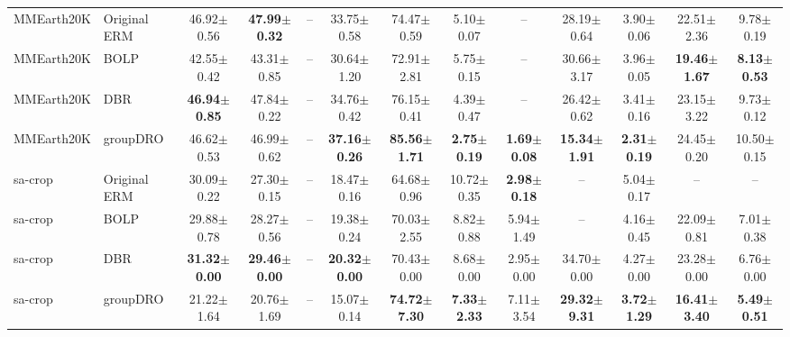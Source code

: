 \documentclass[11pt]{article}
\begin{document}
\begin{table}[h!]
{\begin{tabular}{llccccccccccc}
\midrule

MMEarth20K & Original ERM & 46.92$\pm$0.56 & \textbf{47.99$\pm$0.32} & -- & 33.75$\pm$0.58 & 74.47$\pm$0.59 & 5.10$\pm$0.07 & -- & 28.19$\pm$0.64 & 3.90$\pm$0.06 & 22.51$\pm$2.36 & 9.78$\pm$0.19 \\
MMEarth20K & BOLP & 42.55$\pm$0.42 & 43.31$\pm$0.85 & -- & 30.64$\pm$1.20 & 72.91$\pm$2.81 & 5.75$\pm$0.15 & -- & 30.66$\pm$3.17 & 3.96$\pm$0.05 & \textbf{19.46$\pm$1.67} & \textbf{8.13$\pm$0.53} \\
MMEarth20K & DBR & \textbf{46.94$\pm$0.85} & 47.84$\pm$0.22 & -- & 34.76$\pm$0.42 & 76.15$\pm$0.41 & 4.39$\pm$0.47 & -- & 26.42$\pm$0.62 & 3.41$\pm$0.16 & 23.15$\pm$3.22 & 9.73$\pm$0.12 \\
MMEarth20K & groupDRO & 46.62$\pm$0.53 & 46.99$\pm$0.62 & -- & \textbf{37.16$\pm$0.26} & \textbf{85.56$\pm$1.71} & \textbf{2.75$\pm$0.19} & \textbf{1.69$\pm$0.08} & \textbf{15.34$\pm$1.91} & \textbf{2.31$\pm$0.19} & 24.45$\pm$0.20 & 10.50$\pm$0.15 \\

\midrule

sa-crop & Original ERM & 30.09$\pm$0.22 & 27.30$\pm$0.15 & -- & 18.47$\pm$0.16 & 64.68$\pm$0.96 & 10.72$\pm$0.35 & \textbf{2.98$\pm$0.18} & -- & 5.04$\pm$0.17 & -- & -- \\
sa-crop & BOLP & 29.88$\pm$0.78 & 28.27$\pm$0.56 & -- & 19.38$\pm$0.24 & 70.03$\pm$2.55 & 8.82$\pm$0.88 & 5.94$\pm$1.49 & -- & 4.16$\pm$0.45 & 22.09$\pm$0.81 & 7.01$\pm$0.38 \\
sa-crop & DBR & \textbf{31.32$\pm$0.00} & \textbf{29.46$\pm$0.00} & -- & \textbf{20.32$\pm$0.00} & 70.43$\pm$0.00 & 8.68$\pm$0.00 & 2.95$\pm$0.00 & 34.70$\pm$0.00 & 4.27$\pm$0.00 & 23.28$\pm$0.00 & 6.76$\pm$0.00 \\
sa-crop & groupDRO & 21.22$\pm$1.64 & 20.76$\pm$1.69 & -- & 15.07$\pm$0.14 & \textbf{74.72$\pm$7.30} & \textbf{7.33$\pm$2.33} & 7.11$\pm$3.54 & \textbf{29.32$\pm$9.31} & \textbf{3.72$\pm$1.29} & \textbf{16.41$\pm$3.40} & \textbf{5.49$\pm$0.51} \\
\bottomrule
\end{tabular}%
}
\end{table}


\end{document}
